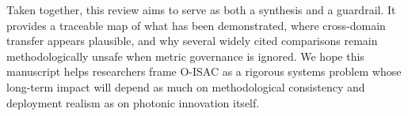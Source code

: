 {}Taken together, this review aims to serve as both a synthesis and a guardrail. It provides a traceable map of what has been demonstrated, where cross-domain transfer appears plausible, and why several widely cited comparisons remain methodologically unsafe when metric governance is ignored. We hope this manuscript helps researchers frame O-ISAC as a rigorous systems problem whose long-term impact will depend as much on methodological consistency and deployment realism as on photonic innovation itself.
\markdownRendererSectionEnd \markdownRendererDocumentEnd
